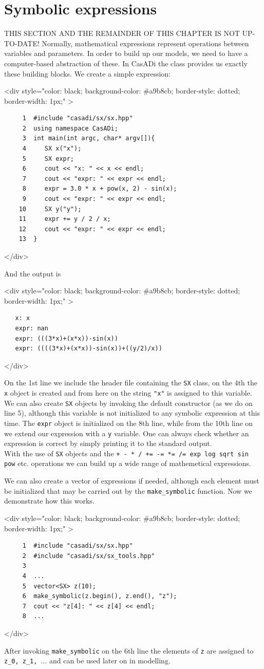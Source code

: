 \documentclass[a4paper,12pt]{book}
\newcommand{\codebegin}{
\begin{rawhtml}
<div style="color: black; background-color: \#a9b8cb;  border-style: dotted; border-width: 1px;" >
\end{rawhtml}
}
\newcommand{\codeend}{
\begin{rawhtml}
</div>
\end{rawhtml}
}
\newcommand{\codebegin}{

}
\newcommand{\codeend}{

}
\begin{document}
{\section{Symbolic expressions}
{\color{red}THIS SECTION AND THE REMAINDER OF THIS CHAPTER IS NOT UP-TO-DATE!}
Normally, mathematical expressions represent operations between variables and parameters.
In order to build up our models, we need to have a computer-based abstraction of these. In CasADi
the \texttt{} class provides us exactly these building blocks. We create a simple expression:
\par
\codebegin
\begin{verbatim}
     1  #include "casadi/sx/sx.hpp"
     2  using namespace CasADi;
     3  int main(int argc, char* argv[]){
     4     SX x("x");
     5     SX expr;
     6     cout << "x: " << x << endl;
     7     cout << "expr: " << expr << endl;
     8     expr = 3.0 * x + pow(x, 2) - sin(x);
     9     cout << "expr: " << expr << endl;
    10     SX y("y");
    11     expr += y / 2 / x;
    12     cout << "expr: " << expr << endl;
    13  }
\end{verbatim}
\codeend
And the output is
\par
\codebegin
\begin{verbatim}
   x: x
   expr: nan
   expr: (((3*x)+(x*x))-sin(x))
   expr: ((((3*x)+(x*x))-sin(x))+((y/2)/x))
\end{verbatim}
\codeend
On the 1st line we include the header file containing the \texttt{SX} class, on the 4th the \texttt{x} object
is created and from here on the string \texttt{"x"} is assigned to this variable. We can also create 
\texttt{SX} objects by invoking the default constructor (as we do on line 5), although this variable is not initialized to any symbolic
expression at this time. The \texttt{expr} object is initialized on the 8th line, while from the 10th line on we extend our expression
with a \texttt{y} variable. One can always check whether an expression is correct by simply printing it to the standard output.\\
With the use of \texttt{SX} objects and the \texttt{+ - * / += -= *= /= exp log sqrt sin pow} etc. operations we can build up a
wide range of mathemetical expressions.
\par
We can also create a vector of expressions if needed, although each element must be initialized that may be
carried out by the \texttt{make\_symbolic} function. Now we demonstrate how this works.
\par
\codebegin
\begin{verbatim}
     1  #include "casadi/sx/sx.hpp"
     2  #include "casadi/sx/sx_tools.hpp"
     3  
     4  ...
     5  vector<SX> z(10);
     6  make_symbolic(z.begin(), z.end(), "z");
     7  cout << "z[4]: " << z[4] << endl;
     8  ...
\end{verbatim}
\codeend
After invoking \texttt{make\_symbolic} on the 6th line the elements of \texttt{z} are assigned to \texttt{z\_0, z\_1, $\dots$} and can be used later on in modelling.
}
\end{document}
